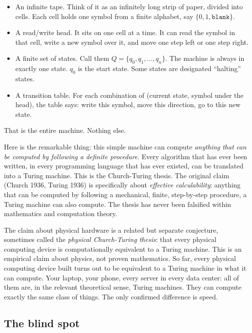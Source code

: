 \documentclass[11pt,a4paper]{article}
\theoremstyle{plain}
\theoremstyle{definition}
\theoremstyle{remark}
\begin{document}
\begin{itemize}
\item An infinite tape. Think of it as an infinitely long strip of paper, divided into cells. Each cell holds one symbol from a finite alphabet, say $\{0, 1, \texttt{blank}\}$.
\item A read/write head. It sits on one cell at a time. It can read the symbol in that cell, write a new symbol over it, and move one step left or one step right.
\item A finite set of states. Call them $Q = \{q_0, q_1, \ldots, q_n\}$. The machine is always in exactly one state. $q_0$ is the start state. Some states are designated ``halting'' states.
\item A transition table. For each combination of (current state, symbol under the head), the table says: write this symbol, move this direction, go to this new state.
\end{itemize}

That is the entire machine. Nothing else.

Here is the remarkable thing: this simple machine can compute \emph{anything that can be computed by following a definite procedure}. Every algorithm that has ever been written, in every programming language that has ever existed, can be translated into a Turing machine. This is the Church-Turing thesis. The original claim (Church 1936, Turing 1936) is specifically about \emph{effective calculability}: anything that can be computed by following a mechanical, finite, step-by-step procedure, a Turing machine can also compute. The thesis has never been falsified within mathematics and computation theory.

The claim about physical hardware is a related but separate conjecture, sometimes called the \emph{physical Church-Turing thesis}: that every physical computing device is computationally equivalent to a Turing machine. This is an empirical claim about physics, not proven mathematics. So far, every physical computing device built turns out to be equivalent to a Turing machine in what it can compute. Your laptop, your phone, every server in every data center: all of them are, in the relevant theoretical sense, Turing machines. They can compute exactly the same class of things. The only confirmed difference is speed.

\subsection{The blind spot}
\end{document}
